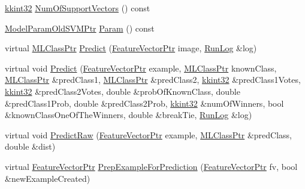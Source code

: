 \begin{DoxyCompactItemize}
\item 
\hyperlink{namespace_k_k_b_a8fa4952cc84fda1de4bec1fbdd8d5b1b}{kkint32} \hyperlink{class_k_k_m_l_l_1_1_model_old_s_v_m_ab7bc08919e8fe98ab8360cbe3c88717d}{Num\+Of\+Support\+Vectors} () const 
\item 
\hyperlink{namespace_k_k_m_l_l_a768d5bdb1e76c57162d3abec212326e4}{Model\+Param\+Old\+S\+V\+M\+Ptr} \hyperlink{class_k_k_m_l_l_1_1_model_old_s_v_m_a4b63adb0ba6362c08692da815fe19ba7}{Param} () const 
\item 
virtual \hyperlink{namespace_k_k_m_l_l_ac272393853d59e72e8456f14cd6d8c23}{M\+L\+Class\+Ptr} \hyperlink{class_k_k_m_l_l_1_1_model_old_s_v_m_a1e663a914e362af34d6fded81c440cbb}{Predict} (\hyperlink{namespace_k_k_m_l_l_a0c5df3d48f45926fbc4fee04f5e3bc04}{Feature\+Vector\+Ptr} image, \hyperlink{class_k_k_b_1_1_run_log}{Run\+Log} \&log)
\item 
virtual void \hyperlink{class_k_k_m_l_l_1_1_model_old_s_v_m_a1fe99aa9b8865806d2275bb52aafc877}{Predict} (\hyperlink{namespace_k_k_m_l_l_a0c5df3d48f45926fbc4fee04f5e3bc04}{Feature\+Vector\+Ptr} example, \hyperlink{namespace_k_k_m_l_l_ac272393853d59e72e8456f14cd6d8c23}{M\+L\+Class\+Ptr} known\+Class, \hyperlink{namespace_k_k_m_l_l_ac272393853d59e72e8456f14cd6d8c23}{M\+L\+Class\+Ptr} \&pred\+Class1, \hyperlink{namespace_k_k_m_l_l_ac272393853d59e72e8456f14cd6d8c23}{M\+L\+Class\+Ptr} \&pred\+Class2, \hyperlink{namespace_k_k_b_a8fa4952cc84fda1de4bec1fbdd8d5b1b}{kkint32} \&pred\+Class1\+Votes, \hyperlink{namespace_k_k_b_a8fa4952cc84fda1de4bec1fbdd8d5b1b}{kkint32} \&pred\+Class2\+Votes, double \&prob\+Of\+Known\+Class, double \&pred\+Class1\+Prob, double \&pred\+Class2\+Prob, \hyperlink{namespace_k_k_b_a8fa4952cc84fda1de4bec1fbdd8d5b1b}{kkint32} \&num\+Of\+Winners, bool \&known\+Class\+One\+Of\+The\+Winners, double \&break\+Tie, \hyperlink{class_k_k_b_1_1_run_log}{Run\+Log} \&log)
\item 
virtual void \hyperlink{class_k_k_m_l_l_1_1_model_old_s_v_m_a9d4e5e1f30b497fa331f555811c4c9ef}{Predict\+Raw} (\hyperlink{namespace_k_k_m_l_l_a0c5df3d48f45926fbc4fee04f5e3bc04}{Feature\+Vector\+Ptr} example, \hyperlink{namespace_k_k_m_l_l_ac272393853d59e72e8456f14cd6d8c23}{M\+L\+Class\+Ptr} \&pred\+Class, double \&dist)
\item 
virtual \hyperlink{namespace_k_k_m_l_l_a0c5df3d48f45926fbc4fee04f5e3bc04}{Feature\+Vector\+Ptr} \hyperlink{class_k_k_m_l_l_1_1_model_old_s_v_m_a4a4acb48564e3597bea933aed21f8d79}{Prep\+Example\+For\+Prediction} (\hyperlink{namespace_k_k_m_l_l_a0c5df3d48f45926fbc4fee04f5e3bc04}{Feature\+Vector\+Ptr} fv, bool \&new\+Example\+Created)

\end{DoxyCompactItemize}

